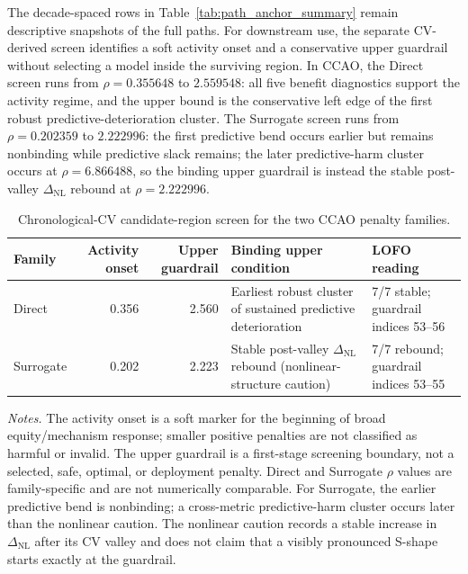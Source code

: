 \documentclass[10pt]{article}
\theoremstyle{definition}
\newcommand{\1}{\mathbf{1}}
\newcommand{\latesttext}[1]{\textcolor{latestPurple}{#1}}
\begin{document}
\latesttext{The decade-spaced rows in Table~\ref{tab:path_anchor_summary} remain descriptive snapshots of the full paths. For downstream use, the separate CV-derived screen identifies a soft activity onset and a conservative upper guardrail without selecting a model inside the surviving region. In CCAO, the Direct screen runs from $\rho=0.355648$ to $2.559548$: all five benefit diagnostics support the activity regime, and the upper bound is the conservative left edge of the first robust predictive-deterioration cluster. The Surrogate screen runs from $\rho=0.202359$ to $2.222996$: the first predictive bend occurs earlier but remains nonbinding while predictive slack remains; the later predictive-harm cluster occurs at $\rho=6.866488$, so the binding upper guardrail is instead the stable post-valley $\Delta_{\mathrm{NL}}$ rebound at $\rho=2.222996$.}

{\color{latestPurple}
\begin{table}[!htbp]
\centering
\small
\setlength{\tabcolsep}{5pt}
\renewcommand{\arraystretch}{1.08}
\caption{Chronological-CV candidate-region screen for the two CCAO penalty families.}
\label{tab:rho_candidate_regions}
\begin{tabularx}{\textwidth}{@{}lrrXl@{}}
\toprule
Family & Activity onset & Upper guardrail & Binding upper condition & LOFO reading \\
\midrule
Direct & 0.356 & 2.560 &
Earliest robust cluster of sustained predictive deterioration &
7/7 stable; guardrail indices 53--56 \\
Surrogate & 0.202 & 2.223 &
Stable post-valley $\Delta_{\mathrm{NL}}$ rebound (nonlinear-structure caution) &
7/7 rebound; guardrail indices 53--55 \\
\bottomrule
\end{tabularx}
\vspace{1mm}
\begin{minipage}{0.98\textwidth}
\scriptsize
\emph{Notes.}
The activity onset is a soft marker for the beginning of broad equity/mechanism response; smaller positive penalties are not classified as harmful or invalid. The upper guardrail is a first-stage screening boundary, not a selected, safe, optimal, or deployment penalty. Direct and Surrogate $\rho$ values are family-specific and are not numerically comparable. For Surrogate, the earlier predictive bend is nonbinding; a cross-metric predictive-harm cluster occurs later than the nonlinear caution. The nonlinear caution records a stable increase in $\Delta_{\mathrm{NL}}$ after its CV valley and does not claim that a visibly pronounced S-shape starts exactly at the guardrail.
\end{minipage}
\end{table}
}
\end{document}
